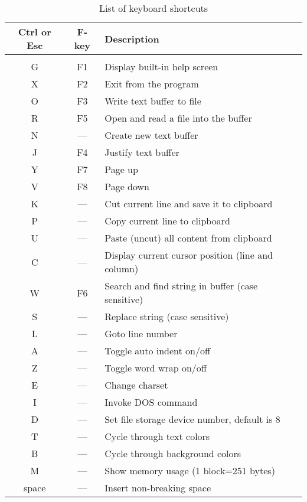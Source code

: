\documentclass{article}
\begin{document}
	\begin{longtable}{c c l}
		\caption{List of keyboard shortcuts} \\
	    \textbf{Ctrl or Esc} & \textbf{F-key} & \textbf{Description} \\
	    \hline \\
            G    & F1    & Display built-in help screen \\
            X    & F2    & Exit from the program \\
            O    & F3    & Write text buffer to file \\
            R    & F5    & Open and read a file into the buffer \\
            N    & ---   & Create new text buffer \\
            J    & F4    & Justify text buffer \\
            Y    & F7    & Page up \\
            V    & F8    & Page down \\
            K    & ---   & Cut current line and save it to clipboard \\
            P    & ---   & Copy current line to clipboard \\
            U    & ---   & Paste (uncut) all content from clipboard \\
            C    & ---   & Display current cursor position (line and column) \\
            W    & F6    & Search and find string in buffer (case sensitive) \\
            S    & ---   & Replace string (case sensitive) \\
            L    & ---   & Goto line number \\
            A    & ---   & Toggle auto indent on/off \\
            Z    & ---   & Toggle word wrap on/off \\
            E    & ---   & Change charset\\
            I    & ---   & Invoke DOS command\\
            D    & ---   & Set file storage device number, default is 8 \\
            T    &  ---  & Cycle through text colors \\
            B    &  ---  & Cycle through background colors \\
            M    &  ---  & Show memory usage (1 block=251 bytes) \\
            space& ---   & Insert non-breaking space 
        \end{longtable}
\end{document}
